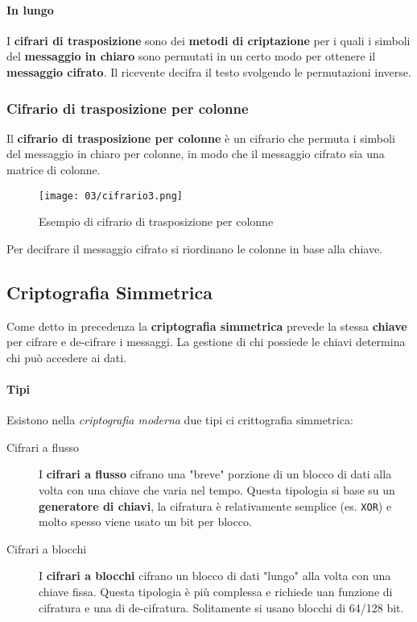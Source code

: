         \paragraph{In lungo} I \textbf{cifrari di trasposizione} sono dei \textbf{metodi di criptazione} per i quali i simboli del \textbf{messaggio in chiaro} sono permutati in un certo modo per ottenere il \textbf{messaggio cifrato}. Il ricevente decifra il testo svolgendo le permutazioni inverse.
        \subsubsection{Cifrario di trasposizione per colonne}
            Il \textbf{cifrario di trasposizione per colonne} è un cifrario che permuta i simboli del messaggio in chiaro per colonne, in modo che il messaggio cifrato sia una matrice di colonne.
            \begin{figure}[H]
                \centering
                \texttt{[image: 03/cifrario3.png]}
                \caption{Esempio di cifrario di trasposizione per colonne}
            \end{figure}
            Per decifrare il messaggio cifrato si riordinano le colonne in base alla chiave.
    \subsection{Criptografia Simmetrica}
        Come detto in precedenza la \textbf{criptografia simmetrica} prevede la stessa \textbf{chiave} per cifrare e de-cifrare i messaggi. La gestione di chi possiede le chiavi determina chi può accedere ai dati.
        \paragraph{Tipi} Esistono nella \textit{criptografia moderna} due tipi ci crittografia simmetrica:
        \begin{description}
            \item[Cifrari a flusso] I \textbf{cifrari a flusso} cifrano una "breve" porzione di un blocco di dati alla volta con una chiave che varia nel tempo. Questa tipologia si base su un \textbf{generatore di chiavi}, la cifratura è relativamente semplice (es. \texttt{XOR}) e molto spesso viene usato un bit per blocco.
            \item[Cifrari a blocchi] I \textbf{cifrari a blocchi} cifrano un blocco di dati "lungo" alla volta con una chiave fissa. Questa tipologia è più complessa e richiede uan funzione di cifratura e una di de-cifratura. Solitamente si usano blocchi di 64/128 bit.  
        \end{description}
